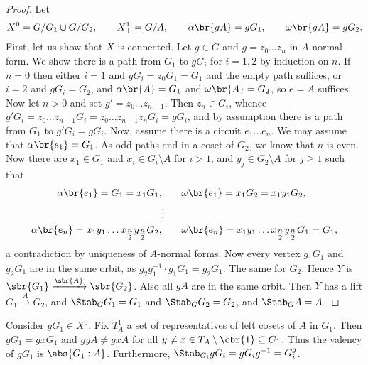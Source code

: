 \begin{proof}
Let
$$ X^0 = G / G_1 \cup G / G_2, \qquad X_+^1 = G / A, \qquad \alpha\br{gA} = gG_1, \qquad \omega\br{gA} = gG_2. $$
First, let us show that $ X $ is connected. Let $ g \in G $ and $ g = z_0 \dots z_n $ in $ A $-normal form. We show there is a path from $ G_1 $ to $ gG_i $ for $ i = 1, 2 $ by induction on $ n $. If $ n = 0 $ then either $ i = 1 $ and $ gG_i = z_0G_1 = G_1 $ and the empty path suffices, or $ i = 2 $ and $ gG_i = G_2 $, and $ \alpha\br{A} = G_1 $ and $ \omega\br{A} = G_2 $, so $ e = A $ suffices. Now let $ n > 0 $ and set $ g' = z_0 \dots z_{n - 1} $. Then $ z_n \in G_i $, whence $ g'G_i = z_0 \dots z_{n - 1}G_i = z_0 \dots z_{n - 1}z_nG_i = gG_i $, and by assumption there is a path from $ G_1 $ to $ g'G_i = gG_i $. Now, assume there is a circuit $ e_1 \dots e_n $. We may assume that $ \alpha\br{e_1} = G_1 $. As odd paths end in a coset of $ G_2 $, we know that $ n $ is even. Now there are $ x_1 \in G_1 $ and $ x_i \in G_i \setminus A $ for $ i > 1 $, and $ y_j \in G_2 \setminus A $ for $ j \ge 1 $ such that
\begin{align*}
\alpha\br{e_1} = G_1 = x_1G_1, & \qquad \omega\br{e_1} = x_1G_2 = x_1y_1G_2, \\
& \vdots \\
\alpha\br{e_n} = x_1y_1 \dots x_{\tfrac{n}{2}}y_{\tfrac{n}{2}}G_2, & \qquad \omega\br{e_n} = x_1y_1 \dots x_{\tfrac{n}{2}}y_{\tfrac{n}{2}}G_1 = G_1,
\end{align*}
a contradiction by uniqueness of $ A $-normal forms. Now every vertex $ g_1G_1 $ and $ g_2G_1 $ are in the same orbit, as $ g_2g_1^{-1} \cdot g_1G_1 = g_2G_1 $. The same for $ G_2 $. Hence $ Y $ is $ \sbr{G_1} \xrightarrow{\sbr{A}} \sbr{G_2} $. Also all $ gA $ are in the same orbit. Then $ Y $ has a lift $ G_1 \xrightarrow{A} G_2 $, and $ \Stab_G G_1 = G_1 $ and $ \Stab_G G_2 = G_2 $, and $ \Stab_G A = A $.
\end{proof}

\pagebreak


\begin{remark}
\label{rem:2.3.3}
Consider $ gG_1 \in X^0 $. Fix $ T_A^1 $ a set of representatives of left cosets of $ A $ in $ G_1 $. Then $ gG_1 = gxG_1 $ and $ gyA \ne gxA $ for all $ y \ne x \in T_A \setminus \cbr{1} \subseteq G_1 $. Thus the valency of $ gG_1 $ is $ \abs{G_1 : A} $. Furthermore, $ \Stab_{G_i} gG_i = gG_ig^{-1} = G_i^g $.
\end{remark}

